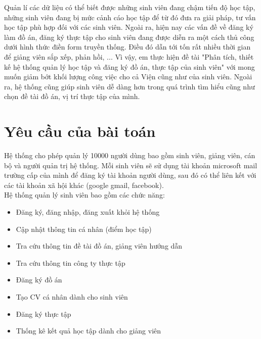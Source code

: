   Quản lí các dữ liệu có thể biết được những sinh viên đang chậm tiến độ học tập, những sinh viên đang bị mức cảnh cáo học tập để từ đó đưa ra giải pháp, tư vấn học tập phù hợp đối với các sinh viên.
  Ngoài ra, hiện nay các vấn đề về đăng ký làm đồ án, đăng ký thực tập cho sinh viên đang được diễn ra một cách thủ công dưới hình thức điền form truyền thống.
  Điều đó dẫn tới tốn rất nhiều thời gian để giảng viên sắp xếp, phản hồi, ... Vì vậy, em thực hiện đề tài "Phân tích, thiết kế hệ thống quản lý học tập và đăng ký đồ án, thực tập của sinh viên"
  với mong muốn giảm bớt khối lượng công việc cho cả Viện cũng như của sinh viên. Ngoài ra, hệ thống cũng giúp sinh viên dễ dàng hơn trong quá trình
  tìm hiểu cũng như chọn đề tài đồ án, vị trí thực tập của mình.

  \section{Yêu cầu của bài toán}
  Hệ thống cho phép quản lý 10000 người dùng bao gồm sinh viên, giảng viên, cán bộ và người quản trị hệ thống.
  Mỗi sinh viên sẽ sử dụng tài khoản microsoft mail trường cấp của mình để đăng ký tài khoản người dùng, sau đó có thể liên kết với
  các tài khoản xã hội khác (google gmail, facebook). \\
  
  Hệ thống quản lý sinh viên bao gồm các chức năng:
  \begin{itemize}
    \item Đăng ký, đăng nhập, đăng xuất khỏi hệ thống
    \item Cập nhật thông tin cá nhân (điểm học tập)
    \item Tra cứu thông tin đề tài đồ án, giảng viên hướng dẫn
    \item Tra cứu thông tin công ty thực tập
    \item Đăng ký đồ án
    \item Tạo CV cá nhân dành cho sinh viên
    \item Đăng ký thực tập
    \item Thống kê kết quả học tập dành cho giảng viên
  \end{itemize}

